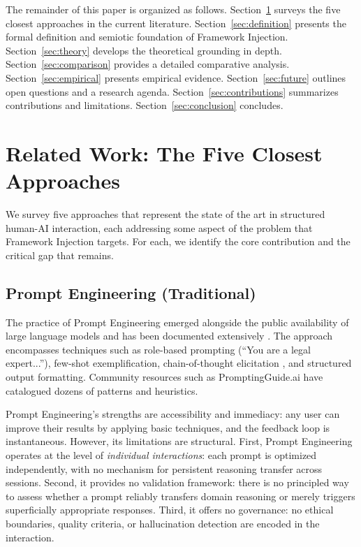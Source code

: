 \documentclass[12pt,a4paper]{article}
\begin{document}
The remainder of this paper is organized as follows. Section~\ref{sec:related} surveys the five closest approaches in the current literature. Section~\ref{sec:definition} presents the formal definition and semiotic foundation of Framework Injection. Section~\ref{sec:theory} develops the theoretical grounding in depth. Section~\ref{sec:comparison} provides a detailed comparative analysis. Section~\ref{sec:empirical} presents empirical evidence. Section~\ref{sec:future} outlines open questions and a research agenda. Section~\ref{sec:contributions} summarizes contributions and limitations. Section~\ref{sec:conclusion} concludes.


\section{Related Work: The Five Closest Approaches}
\label{sec:related}

We survey five approaches that represent the state of the art in structured human-AI interaction, each addressing some aspect of the problem that Framework Injection targets. For each, we identify the core contribution and the critical gap that remains.

\subsection{Prompt Engineering (Traditional)}
\label{sec:related:pe}

The practice of Prompt Engineering emerged alongside the public availability of large language models and has been documented extensively \citep{goodside2022prompt,openai2023cookbook,schulhoff2024prompt}. The approach encompasses techniques such as role-based prompting (``You are a legal expert...''), few-shot exemplification, chain-of-thought elicitation \citep{wei2022chain}, and structured output formatting. Community resources such as PromptingGuide.ai have catalogued dozens of patterns and heuristics.

Prompt Engineering's strengths are accessibility and immediacy: any user can improve their results by applying basic techniques, and the feedback loop is instantaneous. However, its limitations are structural. First, Prompt Engineering operates at the level of \emph{individual interactions}: each prompt is optimized independently, with no mechanism for persistent reasoning transfer across sessions. Second, it provides no validation framework: there is no principled way to assess whether a prompt reliably transfers domain reasoning or merely triggers superficially appropriate responses. Third, it offers no governance: no ethical boundaries, quality criteria, or hallucination detection are encoded in the interaction.
\end{document}
